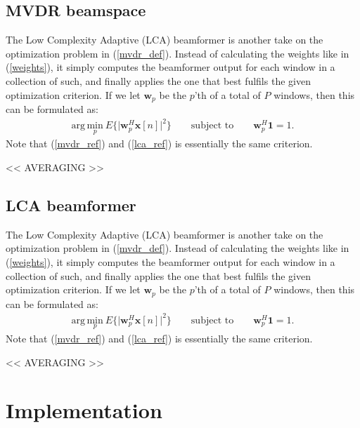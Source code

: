 \documentclass[
a4paper,10pt
]{ica2013_2}
\newcommand\argmin[1]{\text{arg}\,\underset{#1}{\text{min}}}
\newcommand\T{^{\scriptscriptstyle T}}
\renewcommand\H{^{\scriptscriptstyle H}}
\renewcommand\vec[1]{\boldsymbol{#1}}
\newcommand\mat[1]{\boldsymbol{#1}}
\newcommand\1{\vec 1}
\newcommand*\w{\vec w}
\newcommand*\x{\vec x}
\newcommand*\R{\mat R}
\newcommand*\Ri{\R^{-1}}
\begin{document}
\subsection{MVDR beamspace}

The Low Complexity Adaptive (LCA) beamformer is another take on the optimization problem in (\ref{mvdr_def}). Instead of calculating the weights like in (\ref{weights}), it simply computes the beamformer output for each window in a collection of such, and finally applies the one that best fulfils the given optimization criterion. If we let $\w_p$ be the $p$'th of a total of $P$ windows, then this can be formulated as:
\begin{gather}
\argmin{p}\ E\Big\{\big|\w_p\H\x[n]\big|^2\Big\} \qquad\text{subject to}\qquad \w_p\H\1 = 1. \label{lca_def}
\end{gather}
Note that (\ref{mvdr_ref}) and (\ref{lca_ref}) is essentially the same criterion. 

<< AVERAGING >>

\subsection{LCA beamformer}

The Low Complexity Adaptive (LCA) beamformer is another take on the optimization problem in (\ref{mvdr_def}). Instead of calculating the weights like in (\ref{weights}), it simply computes the beamformer output for each window in a collection of such, and finally applies the one that best fulfils the given optimization criterion. If we let $\w_p$ be the $p$'th of a total of $P$ windows, then this can be formulated as:
\begin{gather}
\argmin{p}\ E\Big\{\big|\w_p\H\x[n]\big|^2\Big\} \qquad\text{subject to}\qquad \w_p\H\1 = 1. \label{lca_def}
\end{gather}
Note that (\ref{mvdr_ref}) and (\ref{lca_ref}) is essentially the same criterion. 

<< AVERAGING >>


\section{Implementation}\label{implementation}

\end{document}
